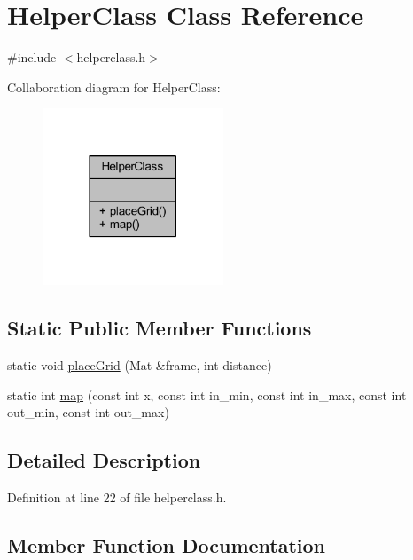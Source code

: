 \hypertarget{class_helper_class}{}\section{Helper\+Class Class Reference}
\label{class_helper_class}


{\ttfamily \#include $<$helperclass.\+h$>$}



Collaboration diagram for Helper\+Class\+:\nopagebreak
\begin{figure}[H]
\begin{center}
\leavevmode
\includegraphics[width=153pt]{class_helper_class__coll__graph}
\end{center}
\end{figure}
\subsection*{Static Public Member Functions}
\begin{DoxyCompactItemize}
\item 
static void \mbox{\hyperlink{class_helper_class_a2628c0f86fb5959325f6aa4272b6f210}{place\+Grid}} (Mat \&frame, int distance)
\item 
static int \mbox{\hyperlink{class_helper_class_a527b26e649e561032d957ce26beb922e}{map}} (const int x, const int in\+\_\+min, const int in\+\_\+max, const int out\+\_\+min, const int out\+\_\+max)
\end{DoxyCompactItemize}


\subsection{Detailed Description}


Definition at line 22 of file helperclass.\+h.



\subsection{Member Function Documentation}
\mbox{\label{class_helper_class_a527b26e649e561032d957ce26beb922e}} 

